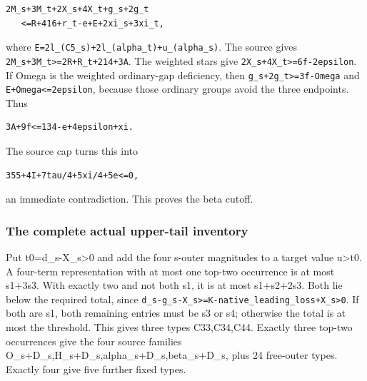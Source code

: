 \documentclass[10pt,a4paper]{article}
\theoremstyle{definition}
\begin{document}
\begin{lstlisting}
2M_s+3M_t+2X_s+4X_t+g_s+2g_t
   <=R+416+r_t-e+E+2xi_s+3xi_t,
\end{lstlisting}

where
\texttt{E=\allowbreak{}2l\_\allowbreak{}\allowbreak{}(C5\_\allowbreak{}\allowbreak{}s)+\allowbreak{}2l\_\allowbreak{}\allowbreak{}(alpha\_\allowbreak{}\allowbreak{}t)+\allowbreak{}u\_\allowbreak{}\allowbreak{}(alpha\_\allowbreak{}\allowbreak{}s)}.
The source gives \texttt{2M\_\allowbreak{}\allowbreak{}s+\allowbreak{}3M\_\allowbreak{}\allowbreak{}t>=\allowbreak{}2R+\allowbreak{}R\_\allowbreak{}\allowbreak{}t+\allowbreak{}214+\allowbreak{}3A}.
The weighted stars give
\texttt{2X\_\allowbreak{}\allowbreak{}s+\allowbreak{}4X\_\allowbreak{}\allowbreak{}t>=\allowbreak{}6f-2epsilon}. If Omega is the
weighted ordinary-gap deficiency,\allowbreak{} then
\texttt{g\_\allowbreak{}\allowbreak{}s+\allowbreak{}2g\_\allowbreak{}\allowbreak{}t>=\allowbreak{}3f-Omega} and
\texttt{E+\allowbreak{}Omega<=\allowbreak{}2epsilon},\allowbreak{} because those ordinary
groups avoid the three endpoints. Thus

\begin{lstlisting}
3A+9f<=134-e+4epsilon+xi.
\end{lstlisting}

The source cap turns this into

\begin{lstlisting}
355+4I+7tau/4+5xi/4+5e<=0,
\end{lstlisting}

an immediate contradiction. This proves the beta cutoff.

\hypertarget{the-complete-actual-upper-tail-inventory}{%
\subsubsection{The complete actual upper-tail
inventory}\label{the-complete-actual-upper-tail-inventory}}

Put t0=\allowbreak{}d\_\allowbreak{}s-X\_\allowbreak{}s\textgreater0 and add the four s-outer magnitudes to a
target value u\textgreater t0. A four-term representation with at most
one top-two occurrence is at most s1+\allowbreak{}3s3. With exactly two and not both
s1,\allowbreak{} it is at most s1+\allowbreak{}s2+\allowbreak{}2s3. Both lie below the required total,\allowbreak{} since
\texttt{d\_\allowbreak{}\allowbreak{}s-g\_\allowbreak{}\allowbreak{}s-X\_\allowbreak{}\allowbreak{}s>=\allowbreak{}K-native\_\allowbreak{}\allowbreak{}leading\_\allowbreak{}\allowbreak{}loss+\allowbreak{}X\_\allowbreak{}\allowbreak{}s>0}.
If both are s1,\allowbreak{} both remaining entries must be s3 or s4; otherwise the
total is at most the threshold. This gives three types C33,\allowbreak{}C34,\allowbreak{}C44.
Exactly three top-two occurrences give the four source families
O\_\allowbreak{}s+\allowbreak{}D\_\allowbreak{}s,\allowbreak{}H\_\allowbreak{}s+\allowbreak{}D\_\allowbreak{}s,\allowbreak{}alpha\_\allowbreak{}s+\allowbreak{}D\_\allowbreak{}s,\allowbreak{}beta\_\allowbreak{}s+\allowbreak{}D\_\allowbreak{}s,\allowbreak{} plus 24 free-outer
types. Exactly four give five further fixed types.
\end{document}
